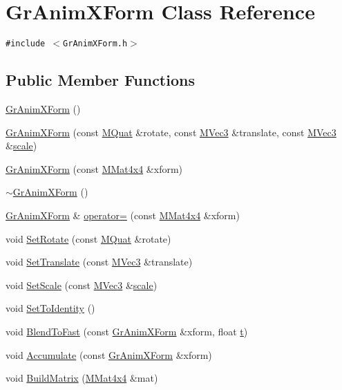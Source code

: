 \hypertarget{class_gr_anim_x_form}{
\section{GrAnimXForm Class Reference}
\label{class_gr_anim_x_form}
}
{\tt \#include $<$GrAnimXForm.h$>$}

\subsection*{Public Member Functions}
\begin{CompactItemize}
\item 
\hyperlink{class_gr_anim_x_form_f72fc165f23278a120e67a83758e17c6}{GrAnimXForm} ()
\item 
\hyperlink{class_gr_anim_x_form_cc12f6a12d1779e8052e0c270136924d}{GrAnimXForm} (const \hyperlink{class_m_quat}{MQuat} \&rotate, const \hyperlink{class_m_vec3}{MVec3} \&translate, const \hyperlink{class_m_vec3}{MVec3} \&\hyperlink{glext__bak_8h_281421b881aa7a1266842b73a3bc7655}{scale})
\item 
\hyperlink{class_gr_anim_x_form_6c46438d6a672eb6d7d32f124ed479a1}{GrAnimXForm} (const \hyperlink{class_m_mat4x4}{MMat4x4} \&xform)
\item 
\hyperlink{class_gr_anim_x_form_caf2e3e62973312c7cf46d9afa85e76c}{$\sim$GrAnimXForm} ()
\item 
\hyperlink{class_gr_anim_x_form}{GrAnimXForm} \& \hyperlink{class_gr_anim_x_form_160982d52c32e88584f651876d18f409}{operator=} (const \hyperlink{class_m_mat4x4}{MMat4x4} \&xform)
\item 
void \hyperlink{class_gr_anim_x_form_0d25495d0795fedc1c50485fa3cbfb97}{SetRotate} (const \hyperlink{class_m_quat}{MQuat} \&rotate)
\item 
void \hyperlink{class_gr_anim_x_form_3940fe69794daeed09ff09ebd8716b49}{SetTranslate} (const \hyperlink{class_m_vec3}{MVec3} \&translate)
\item 
void \hyperlink{class_gr_anim_x_form_034e1b305eeb463ce6714e4b6f8691d0}{SetScale} (const \hyperlink{class_m_vec3}{MVec3} \&\hyperlink{glext__bak_8h_281421b881aa7a1266842b73a3bc7655}{scale})
\item 
void \hyperlink{class_gr_anim_x_form_0dd8f0c7cb5f5ba02bb03d66559e3509}{SetToIdentity} ()
\item 
void \hyperlink{class_gr_anim_x_form_0147d7336963feb4caafcf7d87c4307b}{BlendToFast} (const \hyperlink{class_gr_anim_x_form}{GrAnimXForm} \&xform, float \hyperlink{glext__bak_8h_00140d6f5c548b26daf170bf16e86a6d}{t})
\item 
void \hyperlink{class_gr_anim_x_form_cbda54501f740973df16cd03c9d0d75b}{Accumulate} (const \hyperlink{class_gr_anim_x_form}{GrAnimXForm} \&xform)
\item 
void \hyperlink{class_gr_anim_x_form_a0608b1365ddab9512aeb10827b42d4a}{BuildMatrix} (\hyperlink{class_m_mat4x4}{MMat4x4} \&mat)
\end{CompactItemize}



